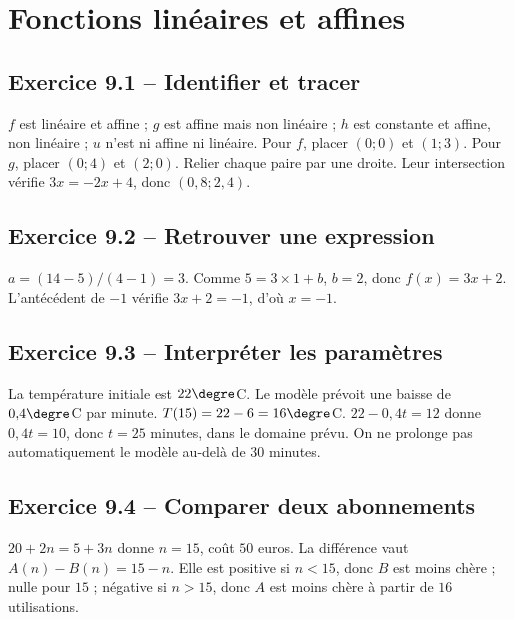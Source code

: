 \chapter{Fonctions linéaires et affines}
\label{corriges:09}
\section*{Exercice 9.1 -- Identifier et tracer}
$f$ est linéaire et affine ; $g$ est affine mais non linéaire ; $h$ est constante et affine, non linéaire ; $u$ n'est ni affine ni linéaire.
Pour $f$, placer $(0;0)$ et $(1;3)$. Pour $g$, placer $(0;4)$ et $(2;0)$. Relier chaque paire par une droite. Leur intersection vérifie $3x=-2x+4$, donc $(0{,}8;2{,}4)$.

\section*{Exercice 9.2 -- Retrouver une expression}
$a=(14-5)/(4-1)=3$. Comme $5=3\times1+b$, $b=2$, donc $f(x)=3x+2$. L'antécédent de $-1$ vérifie $3x+2=-1$, d'où $x=-1$.

\section*{Exercice 9.3 -- Interpréter les paramètres}
La température initiale est $22\degre$C. Le modèle prévoit une baisse de $0{,}4\degre$C par minute.
$T(15)=22-6=16\degre$C.
$22-0{,}4t=12$ donne $0{,}4t=10$, donc $t=25$ minutes, dans le domaine prévu. On ne prolonge pas automatiquement le modèle au-delà de $30$ minutes.

\section*{Exercice 9.4 -- Comparer deux abonnements}
$20+2n=5+3n$ donne $n=15$, coût $50$ euros. La différence vaut $A(n)-B(n)=15-n$. Elle est positive si $n<15$, donc $B$ est moins chère ; nulle pour $15$ ; négative si $n>15$, donc $A$ est moins chère à partir de $16$ utilisations.
